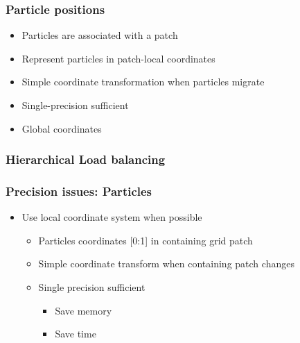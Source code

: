 \documentclass{beamer}
\begin{document}
    \begin{frame}[fragile] \frametitle{Particle positions}
      \begin{itemize}
        \item Particles are associated with a patch
        \item Represent particles in patch-local coordinates
        \item Simple coordinate transformation when particles migrate
        \item Single-precision sufficient
        \item Global coordinates
      \end{itemize}
\end{frame}

    \begin{frame}[fragile] \frametitle{Hierarchical Load balancing}
\end{frame}

    \begin{frame}[fragile] \frametitle{Precision issues: Particles}
      \begin{itemize}
        \item Use local coordinate system when possible
        \begin{itemize}
          \item Particles coordinates [0:1] in containing grid patch
          \item Simple coordinate transform when containing patch changes
          \item Single precision sufficient
          \begin{itemize}
            \item Save memory
            \item Save time
          \end{itemize}
        \end{itemize}
      \end{itemize}
\end{frame}
\end{document}
